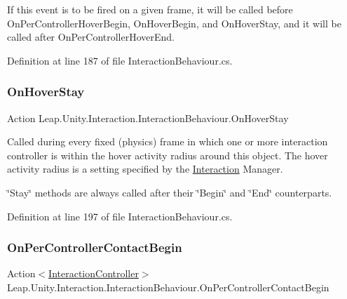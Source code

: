 If this event is to be fired on a given frame, it will be called before On\+Per\+Controller\+Hover\+Begin, On\+Hover\+Begin, and On\+Hover\+Stay, and it will be called after On\+Per\+Controller\+Hover\+End. 

Definition at line 187 of file Interaction\+Behaviour.\+cs.

\mbox{\label{class_leap_1_1_unity_1_1_interaction_1_1_interaction_behaviour_a8aa569872a8b20753ff3c4df34ecc098}} 
\subsubsection{\texorpdfstring{OnHoverStay}{OnHoverStay}}
{\footnotesize\ttfamily Action Leap.\+Unity.\+Interaction.\+Interaction\+Behaviour.\+On\+Hover\+Stay}



Called during every fixed (physics) frame in which one or more interaction controller is within the hover activity radius around this object. The hover activity radius is a setting specified by the \mbox{\hyperlink{namespace_leap_1_1_unity_1_1_interaction}{Interaction}} Manager. 

\char`\"{}\+Stay\char`\"{} methods are always called after their \char`\"{}\+Begin\char`\"{} and \char`\"{}\+End\char`\"{} counterparts. 

Definition at line 197 of file Interaction\+Behaviour.\+cs.

\mbox{\label{class_leap_1_1_unity_1_1_interaction_1_1_interaction_behaviour_a4c5c4aba2acc37dcdab1d22ce35ed742}} 
\subsubsection{\texorpdfstring{OnPerControllerContactBegin}{OnPerControllerContactBegin}}
{\footnotesize\ttfamily Action$<$\mbox{\hyperlink{class_leap_1_1_unity_1_1_interaction_1_1_interaction_controller}{Interaction\+Controller}}$>$ Leap.\+Unity.\+Interaction.\+Interaction\+Behaviour.\+On\+Per\+Controller\+Contact\+Begin}



